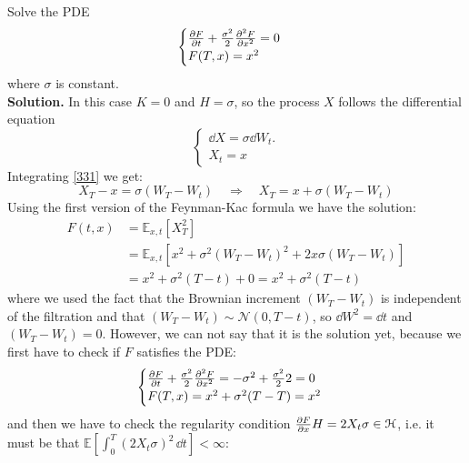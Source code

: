 \begin{example}{}{}{}
    Solve the PDE 
    \begin{equation*}
        \begin{cases}
        \pdv{F}{t}(t,x) + \frac{\sigma^2}{2}\pdv[2]{F}{x}(t,x) = 0\\
        F(T,x) = x^2
        \end{cases}
    \end{equation*}
    where $\sigma$ is constant.\\
    \textbf{Solution.} In this case $K=0$ and $H=\sigma$, so the process $X$ follows the differential equation 
    \begin{equation}\label{331}
        \begin{cases}
        \dd X = \sigma\dd W_t. \tag{$\ast$}\\
        X_t = x
        \end{cases}
    \end{equation}
    Integrating \eqref{331} we get:
    \begin{equation*}
        X_T - x = \sigma(W_T - W_t) \quad\Rightarrow\quad X_T = x + \sigma(W_T - W_t)
    \end{equation*}
    Using the first version of the Feynman-Kac formula we have the solution:
    \begin{align*}
        F(t,x) &= \mathbb{E}_{x,t}[X^2_T] \\
        &=
        \mathbb{E}_{x,t}[x^2 + \sigma^2(W_T - W_t)^2 + 2x\sigma(W_T-W_t)] \\
        &= 
        x^2 + \sigma^2(T-t) + 0 = x^2 + \sigma^2(T-t)
    \end{align*}
    where we used the fact that the Brownian increment $(W_T - W_t)$ is independent of the filtration and that $(W_T-W_t)\sim \mathcal{N}(0,T-t)$, so $\dd W^2 = \dd t$ and $(W_T-W_t)=0$. However, we can not say that it is the solution yet, because we first have to check if $F$ satisfies the PDE:
    \begin{equation*}
        \begin{cases}
        \pdv{F}{t}(t,x) + \frac{\sigma^2}{2}\pdv[2]{F}{x}(t,x) = -\sigma^2 + \frac{\sigma^2}{2}2 = 0\\
        F(T,x) = x^2 + \sigma^2(T-T) = x^2
        \end{cases}
    \end{equation*}
    and then we have to check the regularity condition $\pdv{F}{x}H = 2X_t\sigma\in\mathcal{H}$, i.e. it must be that $\mathbb{E}\left[\int^T_0 (2X_t\sigma)^2\,\dd t\right] < \infty$:

\end{example}
